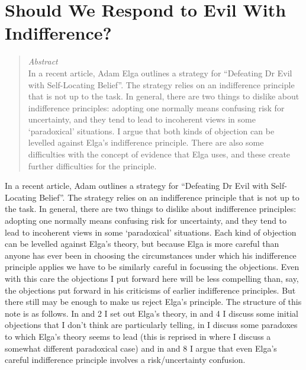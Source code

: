 

%
%
%
%
%
%
%
%
%
%
\chapter{Should We Respond to Evil With Indifference?}

\begin{quote}
\textit{Abstract} \\
In a recent article, Adam Elga outlines a strategy for ``Defeating Dr Evil with Self-Locating Belief''. The strategy relies on an indifference principle that is not up to the task. In general, there are two things to dislike about indifference principles: adopting one normally means confusing risk for uncertainty, and they tend to lead to incoherent views in some `paradoxical' situations. I argue that both kinds of objection can be levelled against Elga's indifference principle. There are also some difficulties with the concept of evidence that Elga uses, and these create further difficulties for the principle.
\end{quote}

\noindent In a recent article, Adam \citeauthor{Elga2004} outlines a strategy for ``Defeating Dr Evil with Self-Locating Belief''. The strategy relies on an indifference principle that is not up to the task. In general, there are two things to dislike about indifference principles: adopting one normally means confusing risk for uncertainty, and they tend to lead to incoherent views in some `paradoxical' situations. Each kind of objection can be levelled against Elga's theory, but because Elga is more careful than anyone has ever been in choosing the circumstances under which his indifference principle applies we have to be similarly careful in focussing the objections. Even with this care the objections I put forward here will be less compelling than, say, the objections \cite[Ch. 4]{Keynes1921} put forward in his criticisms of earlier indifference principles. But there still may be enough to make us reject Elga's principle. The structure of this note is as follows. In \textsection{} and 2 I set out Elga's theory, in \textsection{} and 4 I discuss some initial objections that I don't think are particularly telling, in  I discuss some paradoxes to which Elga's theory seems to lead (this is reprised in  where I discuss a somewhat different paradoxical case) and in \textsection{} and 8 I argue that even Elga's careful indifference principle involves a risk/uncertainty confusion. 

